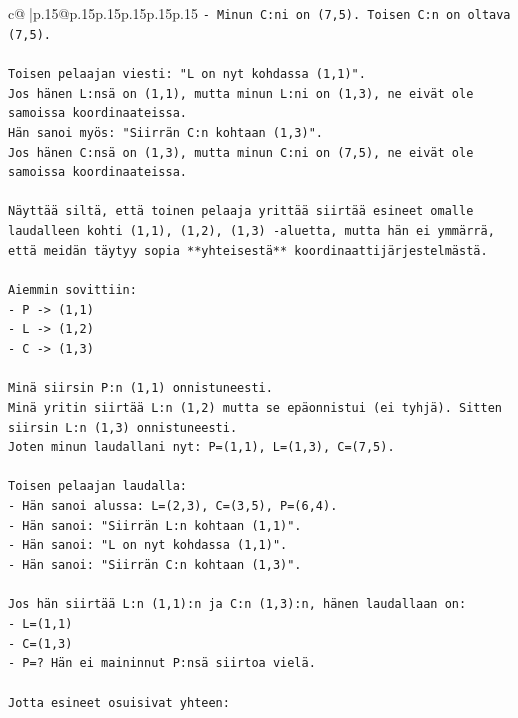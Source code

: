 \documentclass{article}
\begin{document}
{\begin{supertabular}{c@{$\;$}|p{.15\linewidth}@{}p{.15\linewidth}p{.15\linewidth}p{.15\linewidth}p{.15\linewidth}p{.15\linewidth}}
{{{\texttt{{-} Minun C:ni on (7,5). Toisen C:n on oltava (7,5).} \\
\\ 
\texttt{Toisen pelaajan viesti: "L on nyt kohdassa (1,1)".} \\
\texttt{Jos hänen L:nsä on (1,1), mutta minun L:ni on (1,3), ne eivät ole samoissa koordinaateissa.} \\
\texttt{Hän sanoi myös: "Siirrän C:n kohtaan (1,3)".} \\
\texttt{Jos hänen C:nsä on (1,3), mutta minun C:ni on (7,5), ne eivät ole samoissa koordinaateissa.} \\
\\ 
\texttt{Näyttää siltä, että toinen pelaaja yrittää siirtää esineet omalle laudalleen kohti (1,1), (1,2), (1,3) {-}aluetta, mutta hän ei ymmärrä, että meidän täytyy sopia **yhteisestä** koordinaattijärjestelmästä.} \\
\\ 
\texttt{Aiemmin sovittiin:} \\
\texttt{{-} P {-}> (1,1)} \\
\texttt{{-} L {-}> (1,2)} \\
\texttt{{-} C {-}> (1,3)} \\
\\ 
\texttt{Minä siirsin P:n (1,1) onnistuneesti.} \\
\texttt{Minä yritin siirtää L:n (1,2) mutta se epäonnistui (ei tyhjä). Sitten siirsin L:n (1,3) onnistuneesti.} \\
\texttt{Joten minun laudallani nyt: P=(1,1), L=(1,3), C=(7,5).} \\
\\ 
\texttt{Toisen pelaajan laudalla:} \\
\texttt{{-} Hän sanoi alussa: L=(2,3), C=(3,5), P=(6,4).} \\
\texttt{{-} Hän sanoi: "Siirrän L:n kohtaan (1,1)".} \\
\texttt{{-} Hän sanoi: "L on nyt kohdassa (1,1)".} \\
\texttt{{-} Hän sanoi: "Siirrän C:n kohtaan (1,3)".} \\
\\ 
\texttt{Jos hän siirtää L:n (1,1):n ja C:n (1,3):n, hänen laudallaan on:} \\
\texttt{{-} L=(1,1)} \\
\texttt{{-} C=(1,3)} \\
\texttt{{-} P=? Hän ei maininnut P:nsä siirtoa vielä.} \\
\\ 
\texttt{Jotta esineet osuisivat yhteen:} \\
}}}
\end{supertabular}}
\end{document}
